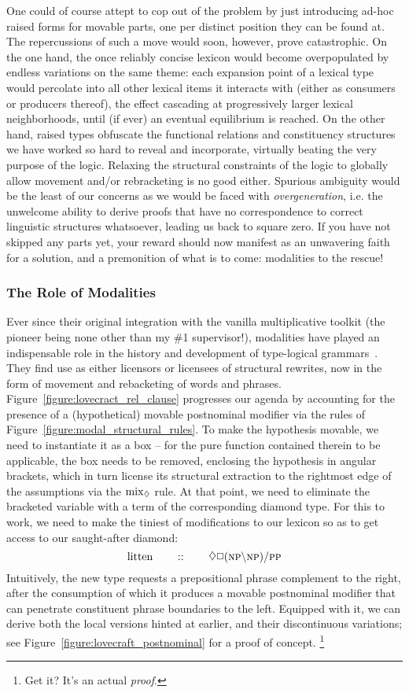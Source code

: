 One could of course attept to cop out of the problem by just introducing ad-hoc raised forms for movable parts, one per distinct position they can be found at. 
The repercussions of such a move would soon, however, prove catastrophic.
On the one hand, the once reliably concise lexicon would become overpopulated by endless variations on the same theme: each expansion point of a lexical type would percolate into all other lexical items it interacts with (either as consumers or producers thereof), the effect cascading at progressively larger lexical neighborhoods, until (if ever) an eventual equilibrium is reached.
On the other hand, raised types obfuscate the functional relations and constituency structures we have worked so hard to reveal and incorporate, virtually beating the very purpose of the logic.
Relaxing the structural constraints of the logic to globally allow movement and/or rebracketing is no good either.
Spurious ambiguity would be the least of our concerns as we would be faced with \textit{overgeneration}, i.e. the unwelcome ability to derive proofs that have no correspondence to correct linguistic structures whatsoever, leading us back to square zero.
If you have not skipped any parts yet, your reward should now manifest as an unwavering faith for a solution, and a premonition of what is to come: modalities to the rescue!

\subsubsection{The Role of Modalities}
Ever since their original integration with the vanilla multiplicative toolkit (the pioneer being none other than my \#1 supervisor!), modalities have played an indispensable role in the history and development of type-logical grammars~\cite{moortgat1996multimodal}.
They find use as either licensors or licensees of structural rewrites, now in the form of movement and rebacketing of words and phrases.
Figure~\ref{figure:lovecract_rel_clause} progresses our agenda by accounting for the presence of a (hypothetical) movable postnominal modifier via the rules of Figure~\ref{figure:modal_structural_rules}.
To make the hypothesis movable, we need to instantiate it as a box -- for the pure function contained therein to be applicable, the box needs to be removed, enclosing the hypothesis in angular brackets, which in turn license its structural extraction to the rightmost edge of the assumptions via the $\rulestyle{mix}_{\diamond}$ rule.
At that point, we need to eliminate the bracketed variable with a term of the corresponding diamond type.
For this to work, we need to make the tiniest of modifications to our lexicon so as to get access to our saught-after diamond:
\[
	\w{litten} \qquad :: \qquad \diamond\Box (\np\divleft\np)\divright\pp
\]
Intuitively, the new type requests a prepositional phrase complement to the right, after the consumption of which it produces a movable postnominal modifier that can penetrate constituent phrase boundaries to the left.
Equipped with it, we can derive both the local versions hinted at earlier, and their discontinuous variations; see Figure~\ref{figure:lovecraft_postnominal} for a proof of concept.%
\footnote{Get it? It's an actual \textit{proof}.} 

